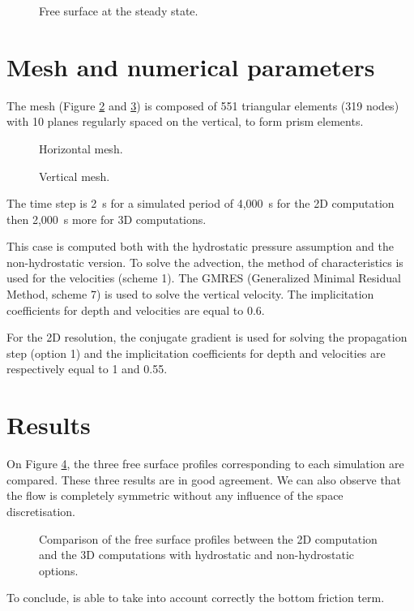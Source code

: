 \begin{figure}[!htbp]
 \centering
 \caption{Free surface at the steady state.}
 \label{t3d:canal:fig:freeSurface}
\end{figure}
\section{Mesh and numerical parameters}
\bigskip
The mesh (Figure \ref{t3d:canal:fig:meshH} and \ref{t3d:canal:fig:meshV})  
is composed of 551 triangular elements (319 nodes) with 10 planes  
regularly spaced on the vertical, to form prism elements.\\

\begin{figure}[!htbp]
 \centering
 \caption{Horizontal mesh.}
 \label{t3d:canal:fig:meshH}
\end{figure}
\begin{figure}[!htbp]
 \centering
 \caption{Vertical mesh.}
 \label{t3d:canal:fig:meshV}
\end{figure}


\bigskip
The time step is 2~s for a simulated period of 4,000~s for the 2D computation
then 2,000~s more for 3D computations.

\bigskip
This case is computed both with the hydrostatic pressure assumption and the non-hydrostatic version. 
To solve the advection, the method of characteristics
is used for the velocities (scheme 1). The GMRES 
(Generalized Minimal Residual Method, scheme 7) is used to solve 
the vertical velocity.  The implicitation coefficients 
for depth and velocities are equal to 0.6.

For the 2D resolution, the conjugate gradient
is used for solving the propagation step (option 1) and
the implicitation coefficients 
for depth and velocities are respectively equal to 1 and 0.55. 
%
\section{Results}

\bigskip
On Figure \ref{t3d:canal:fig:profiles}, the three free surface profiles corresponding to each
simulation are compared.
These three results are in good agreement.
We can also observe that the flow is completely symmetric without
any influence of the space discretisation.

\begin{figure}[!htbp]
 \centering
 \caption{Comparison of the free surface profiles between the 2D 
 computation  and the 3D computations 
 with hydrostatic and non-hydrostatic options. }
 \label{t3d:canal:fig:profiles}
 \end{figure}
 

\bigskip
To conclude,  is able to take into account correctly the bottom friction
term.
%
